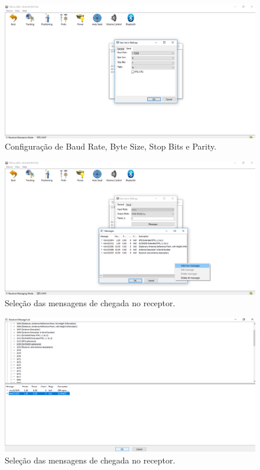 \begin{figure}[H]
\centering
\includegraphics[scale=0.4]{img/11.png} %
\caption{Configuração de Baud Rate, Byte Size, Stop Bits e Parity.}
\label{Rotulo}
\end{figure}

\begin{figure}[H]
\centering
\includegraphics[scale=0.4]{img/13.png} %
\caption{Seleção das mensagens de chegada no receptor.}
\label{Rotulo}
\end{figure}

\begin{figure}[H]
\centering
\includegraphics[scale=0.4]{img/14.png} %
\caption{Seleção das mensagens de chegada no receptor.}
\label{Rotulo}
\end{figure}

